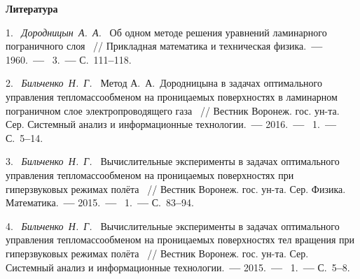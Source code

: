 \smallskip \centerline {\bf Литература} \nopagebreak



1.~%
\textit%
{Дородницын~А.~А.~}
{%
 {Об  одном  методе  решения
 уравнений  ламинарного  пограничного  слоя}%
~/$\!$/
 {Прикладная  математика
  и  техническая  физика}.~{\textbf{---}}
  1960.~{\textbf{---}}
  \No~3.~{\textbf{---}}
  С.~111{\textbf{--}}118.%
  }



2.~%
\textit%
{Бильченко~Н.~Г.~}
{%
  {Метод  А.~А.~Дородницына
  в  задачах  оптимального  управления
  тепломассообменом  на  проницаемых  поверхностях
  в  ламинарном  пограничном  слое
  электропроводящего  газа}%
~/$\!$/
  Вестник  Воронеж.  гос.  ун-та.
  Сер.  Системный  анализ
  и  информационные  технологии.~{\textbf{---}}
  2016.~{\textbf{---}}
  \No~1.~{\textbf{---}}
  С.~5{\textbf{--}}14.%
  }



3.~%
\textit%
{Бильченко~Н.~Г.~}
{%
 {Вычислительные
  эксперименты
  в
  задачах
  оптимального
  управления
  тепломассообменом
  на  проницаемых  поверхностях
  при  гиперзвуковых  режимах  полёта}%
~/$\!$/
  Вестник  Воронеж.  гос.  ун-та.
  Сер.  Физика.  Математика.~{\textbf{---}}
  2015.~{\textbf{---}}
  \No~1.~{\textbf{---}}
  С.~83{\textbf{--}}94.%
  }



4.~%
\textit%
{Бильченко~Н.~Г.~}
{%
  {Вычислительные
   эксперименты
   в
   задачах
   оптимального
   управления
   тепломассообменом
   на  проницаемых  поверхностях
   тел  вращения
   при  гиперзвуковых  режимах  полёта}%
~/$\!$/
  Вестник  Воронеж.  гос.  ун-та.
  Сер.  Системный  анализ
  и  информационные  технологии.~{\textbf{---}}
  2015.~{\textbf{---}}
  \No~1.~{\textbf{---}}
  С.~5{\textbf{--}}8.%
  }



